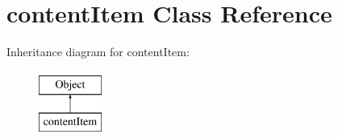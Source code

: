 \hypertarget{classcontentItem}{}\section{content\+Item Class Reference}
\label{classcontentItem}
Inheritance diagram for content\+Item\+:\begin{figure}[H]
\begin{center}
\leavevmode
\includegraphics[height=2.000000cm]{classcontentItem}
\end{center}
\end{figure}
